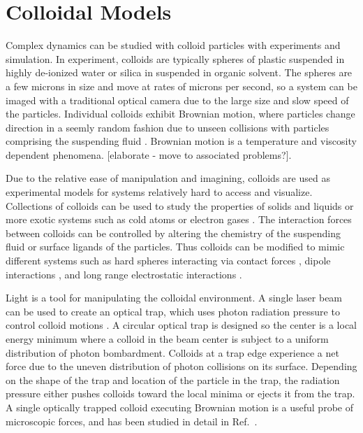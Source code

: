 \documentclass[twocolumn,preprintnumbers,amsmath,amssymb,aps,prx]{revtex4}
\begin{document}

%
%


\section{Colloidal Models}
\label{sec:colloids}

Complex dynamics can be studied with
colloid particles with experiments and simulation.
In experiment, colloids are typically spheres of 
plastic suspended in
highly de-ionized water or silica in suspended in organic solvent.
The spheres are a few microns in size
and move at rates of microns per second,
so a system can be imaged
with a traditional optical camera
due to the large size and slow speed of the particles.
Individual colloids exhibit 
Brownian motion,
where particles change direction in a seemly random fashion
due to unseen 
collisions 
with particles comprising the suspending fluid \cite{}.
Brownian motion is a temperature and viscosity dependent
phenomena. \cite{}
[elaborate - move to associated problems?].

Due to the relative ease of
manipulation and imagining, 
colloids are used as experimental models
for systems relatively hard to access and visualize. 
Collections of colloids can
be used to study the properties of solids and liquids
or more exotic systems 
such as cold atoms or electron gases \cite{Grier2003}.  
The interaction forces between colloids can be controlled 
by altering the chemistry of the suspending fluid
or surface ligands of the particles.
Thus colloids can 
be modified to mimic different
systems such as hard spheres interacting via contact forces \cite{},
dipole interactions \cite{},
and long range electrostatic interactions \cite{}.

Light is a
tool for manipulating the colloidal environment.
A single laser beam can be used to create an optical trap,
which uses 
photon radiation pressure to
control colloid motions \cite{Ashkin1997}.
A circular optical trap is designed so the center is
a local energy minimum where 
a colloid in the beam center is subject to a
uniform distribution of photon bombardment. %
Colloids at a trap edge
experience a net force
due to the uneven 
distribution of photon collisions on its surface.
Depending on the shape of the trap and location of the particle in the trap,
the radiation pressure either pushes colloids toward the local minima
or ejects it from the trap.
A single optically trapped colloid executing Brownian motion
is a useful probe of microscopic forces,
and has been studied in detail in Ref.~\cite{Volpe2013}.
\end{document}
